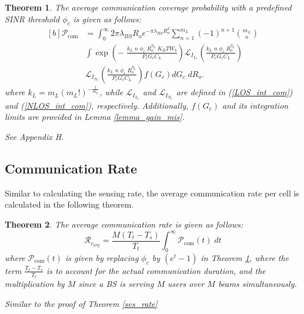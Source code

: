 \documentclass[journal]{IEEEtran}
\newtheorem{theorem}{\textbf{Theorem}}
\begin{document}
\begin{theorem} \label{com_cov_prob}
The average communication coverage probability with a predefined SINR threshold $\phi_c$ is given as follows:
\begin{equation}
\begin{aligned}[b]
\mathcal{P}_{\text{com}}&= \int_{0}^{\infty} 2 \pi \lambda_{BS} R_o e^{-\pi \lambda_{BS} R_o^2} \sum_{n=1}^{m_L} \left(-1\right)^{n+1} {m_L \choose n}\\
&\int \exp\left(-\;\frac{k_L\;n \;\phi_c \; R_o^{\eta_L}\; K_B T W_b}{P_c G_c C_L}\right) \mathcal{L}_{I_{L_c}} \left(\frac{k_L\;n \;\phi_c \; R_o^{\eta_L}}{P_c G_c C_L}\right)\\
&\mathcal{L}_{I_{N_c}} \left(\frac{k_L\;n \;\phi_c \; R_o^{\eta_L}}{P_c G_c C_L}\right)f\left(G_c\right) dG_c\; dR_o.
\end{aligned}
\end{equation}
where \(k_L = m_L(m_L!)^{-\frac{1}{m_L}}\), while \(\mathcal{L}_{I_{L_c}}\) and \(\mathcal{L}_{I_{N_c}}\) are defined in (\ref{LOS_int_com}) and (\ref{NLOS_int_com}), respectively. Additionally, \(f(G_c)\) and its integration limits are provided in Lemma \ref{lemma_gain_mis}.
\begin{IEEEproof}
See Appendix H.
\end{IEEEproof}
\end{theorem}



\subsection{Communication Rate}

Similar to calculating the sensing rate, the average communication rate per cell is calculated in the following theorem.
\begin{theorem} \label{comm_rate}
The average communication  rate is given as follows:
\small
\begin{equation}
\mathcal{R}_{c_{\text{avg}}}=\frac{M(T_t - T_s)}{T_t} \int_0^\infty \mathcal{P}_{\text{com}}(t)\; dt 
\end{equation}
\normalsize
where $\mathcal{P}_{\text{com}}(t)$ is given by replacing $\phi_c$ by $( e^t - 1)$ in Theorem \ref{com_cov_prob}, where the term \(\frac{T_t - T_s}{T_t}\) is to account for the actual communication duration, and the multiplication by $M$ since a BS is serving $M$ users over $M$ beams simultaneously.
\begin{IEEEproof}
Similar to the proof of Theorem \ref{ses_rate} 
\end{IEEEproof}
\end{theorem}
\end{document}
